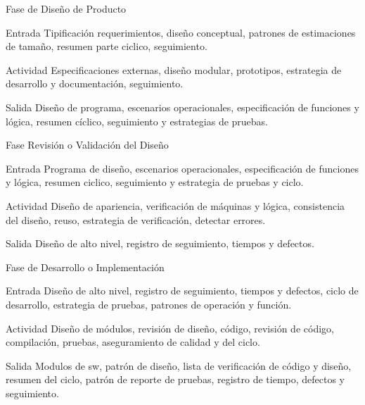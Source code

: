 \documentclass{beamer}
\begin{document}
			\begin{frame}{Fase de Diseño de Producto}
				\begin{block}{Entrada}
					Tipificación requerimientos, diseño conceptual, patrones de estimaciones de tamaño, resumen parte ciclico, seguimiento.
				\end{block}
				\begin{block}{Actividad}
					Especificaciones externas, diseño modular, prototipos, estrategia de desarrollo y documentación, seguimiento.
				\end{block}
				\begin{block}{Salida}
					Diseño de programa, escenarios operacionales, especificación de funciones y lógica, resumen cíclico, seguimiento y estrategias de pruebas.
				\end{block}
			\end{frame}

			\begin{frame}{Fase Revisión o Validación del Diseño}
				\begin{block}{Entrada}
					Programa de diseño, escenarios operacionales, especificación de funciones y lógica, resumen ciclico, seguimiento y estrategia de pruebas y ciclo.
				\end{block}
				\begin{block}{Actividad}
					Diseño de apariencia, verificación de máquinas y lógica, consistencia del diseño, reuso, estrategia de verificación, detectar errores.
				\end{block}
				\begin{block}{Salida}
					Diseño de alto nivel, registro de seguimiento, tiempos y defectos.
				\end{block}
			\end{frame}
			
			\begin{frame}{Fase de Desarrollo o Implementación}
				\begin{block}{Entrada}
					Diseño de alto nivel, registro de seguimiento, tiempos y defectos, ciclo de desarrollo, estrategia de pruebas, patrones de operación y función.
				\end{block}
				\begin{block}{Actividad}
					Diseño de módulos, revisión de diseño, código, revisión de código, compilación, pruebas, aseguramiento de calidad y del ciclo.
				\end{block}
				\begin{block}{Salida}
					Modulos de sw, patrón de diseño, lista de verificación de código y diseño, resumen del ciclo, patrón de reporte de pruebas, registro de tiempo, defectos y seguimiento.
				\end{block}
			\end{frame}			
			
\end{document}
